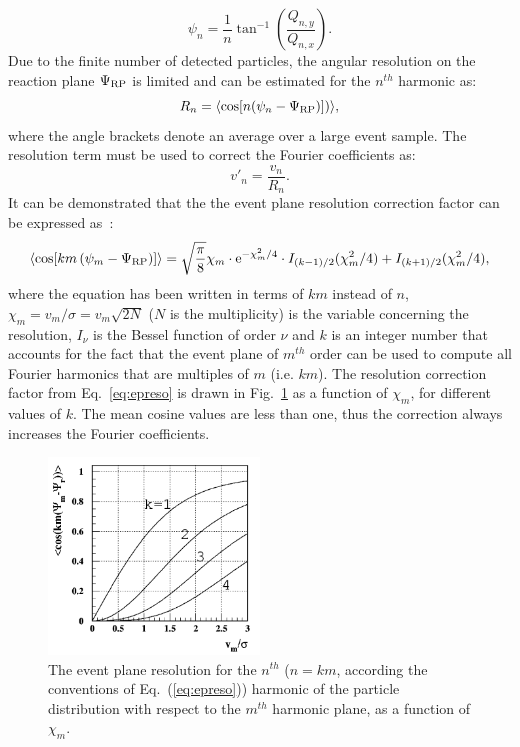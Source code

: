 \begin{equation}
\psi_n = \dfrac{1}{n} \tan^{-1} \left(\dfrac{Q_{n,y}}{Q_{n,x}}\right).
\end{equation}
Due to the finite number of detected particles, the
angular resolution on the reaction plane $\Psi_{\rm RP}$ is limited and 
can be estimated for the $n^{th}$ harmonic as:
\begin{equation}
R_n = \langle {\rm cos}[n({\rm \psi}_n-{\rm \Psi}_{\rm RP})]) \rangle ,
\end{equation}
where the angle brackets denote an average over a large event sample.
The resolution term must be used to correct the Fourier coefficients as:
\begin{equation}
v'_n = \frac{v_n}{R_n}.
\end{equation}
It can be demonstrated that the the event plane resolution correction factor
can be expressed as~\cite{Poskanzer:1998yz}:
\begin{equation}
\label{eq:epreso}
\left\langle \cos [km\left( \psi_m-\Psi_{\rm RP}\right)]\right\rangle = \sqrt{\dfrac{\pi }{8}} \chi_m \cdot {\rm e}^{-\chi_m^2/4} \cdot I_{(k-1)/2}(\chi_m^2/4)+I_{(k+1)/2}(\chi_m^2/4),
\end{equation}
where the equation has been written in terms of $km$ 
instead of $n$, $\chi_m= v_m/\sigma = v_m\sqrt{2N}$ ($N$ is the multiplicity) is the variable concerning the
resolution, $I_\nu$ is the Bessel function of order $\nu$ and
$k$ is an integer number that accounts for the fact that the 
event plane of $m^{th}$ order can be used to compute all Fourier harmonics that are multiples
of $m$ (i.e. $km$). The resolution correction factor from Eq.~\ref{eq:epreso} is
drawn in Fig.~\ref{fig:resoBessel} as a function of $\chi_m$, for 
different values of $k$. 
The mean cosine values are less than one, thus the 
correction always increases the Fourier coefficients.
\begin{figure}
\centering
 \includegraphics[width=0.5\textwidth]{FigCap5/resolBessel.png}
 \caption[Event plane resolution vs $\chi_m$]{The event plane resolution for the $n^{ th}$ ($n=km$, according the conventions of Eq.~(\ref{eq:epreso})) harmonic of the particle distribution with respect to the $m^{ th}$ harmonic plane, as a function of $\chi_m$.}
 \label{fig:resoBessel}
\end{figure}
